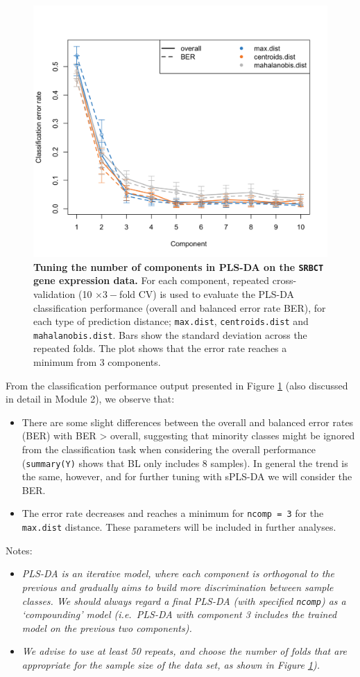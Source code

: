 \documentclass[]{book}
\providecommand{\tightlist}{%
  \setlength{\itemsep}{0pt}\setlength{\parskip}{0pt}}
\begin{document}
\begin{figure}

{\centering \includegraphics[width=0.5\linewidth]{Figures/PLSDA/plsda-perf-1} 

}

\caption{\textbf{Tuning the number of components in PLS-DA on the \texttt{SRBCT} gene expression data.} For each component, repeated cross-validation (10 \(\times 3-\)fold CV) is used to evaluate the PLS-DA classification performance (overall and balanced error rate BER), for each type of prediction distance; \texttt{max.dist}, \texttt{centroids.dist} and \texttt{mahalanobis.dist}. Bars show the standard deviation across the repeated folds. The plot shows that the error rate reaches a minimum from 3 components.}\label{fig:plsda-perf}
\end{figure}



From the classification performance output presented in Figure \ref{fig:plsda-perf} (also discussed in detail in Module 2), we observe that:

\begin{itemize}
\item
  There are some slight differences between the overall and balanced error rates (BER) with BER \textgreater{} overall, suggesting that minority classes might be ignored from the classification task when considering the overall performance (\texttt{summary(Y)} shows that BL only includes 8 samples). In general the trend is the same, however, and for further tuning with sPLS-DA we will consider the BER.
\item
  The error rate decreases and reaches a minimum for \texttt{ncomp\ =\ 3} for the \texttt{max.dist} distance. These parameters will be included in further analyses.
\end{itemize}

Notes:

\begin{itemize}
\tightlist
\item
  \emph{PLS-DA is an iterative model, where each component is orthogonal to the previous and gradually aims to build more discrimination between sample classes. We should always regard a final PLS-DA (with specified \texttt{ncomp}) as a `compounding' model (i.e.~PLS-DA with component 3 includes the trained model on the previous two components).}
\item
  \emph{We advise to use at least 50 repeats, and choose the number of folds that are appropriate for the sample size of the data set, as shown in Figure \ref{fig:plsda-perf}).}
\end{itemize}
\end{document}
